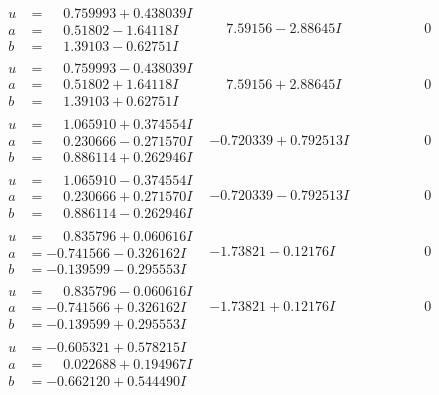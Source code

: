 \documentclass[1p]{elsarticle_modified}
\theoremstyle{definition}
\begin{document}
$$\begin{array}{c|c|c}
\begin{aligned}
u &= \phantom{-}0.759993 + 0.438039 I \\
a &= \phantom{-}0.51802 - 1.64118 I \\
b &= \phantom{-}1.39103 - 0.62751 I\end{aligned}
 & \phantom{-}7.59156 - 2.88645 I & \phantom{-0.000000 } 0 \\ \hline\begin{aligned}
u &= \phantom{-}0.759993 - 0.438039 I \\
a &= \phantom{-}0.51802 + 1.64118 I \\
b &= \phantom{-}1.39103 + 0.62751 I\end{aligned}
 & \phantom{-}7.59156 + 2.88645 I & \phantom{-0.000000 } 0 \\ \hline\begin{aligned}
u &= \phantom{-}1.065910 + 0.374554 I \\
a &= \phantom{-}0.230666 - 0.271570 I \\
b &= \phantom{-}0.886114 + 0.262946 I\end{aligned}
 & -0.720339 + 0.792513 I & \phantom{-0.000000 } 0 \\ \hline\begin{aligned}
u &= \phantom{-}1.065910 - 0.374554 I \\
a &= \phantom{-}0.230666 + 0.271570 I \\
b &= \phantom{-}0.886114 - 0.262946 I\end{aligned}
 & -0.720339 - 0.792513 I & \phantom{-0.000000 } 0 \\ \hline\begin{aligned}
u &= \phantom{-}0.835796 + 0.060616 I \\
a &= -0.741566 - 0.326162 I \\
b &= -0.139599 - 0.295553 I\end{aligned}
 & -1.73821 - 0.12176 I & \phantom{-0.000000 } 0 \\ \hline\begin{aligned}
u &= \phantom{-}0.835796 - 0.060616 I \\
a &= -0.741566 + 0.326162 I \\
b &= -0.139599 + 0.295553 I\end{aligned}
 & -1.73821 + 0.12176 I & \phantom{-0.000000 } 0 \\ \hline\begin{aligned}
u &= -0.605321 + 0.578215 I \\
a &= \phantom{-}0.022688 + 0.194967 I \\
b &= -0.662120 + 0.544490 I\end{aligned}

\end{array}$$
\end{document}
